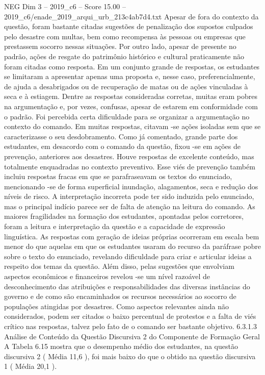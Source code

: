 \begin{textsample}{NEG Dim 3 – 2019\_c6 – Score 15.00 – 2019\_c6/enade\_2019\_arqui\_urb\_213c4ab7d4.txt}
Apesar de fora do contexto da questão, foram bastante citadas sugestões de penalização dos supostos culpados pelo desastre com multas, bem como recompensa às pessoas ou empresas que prestassem socorro nessas situações.
Por outro lado, apesar de presente no padrão, ações de resgate do patrimônio histórico e cultural praticamente não foram citadas como resposta.
Em um conjunto grande de respostas, os estudantes se limitaram a apresentar apenas uma proposta e, nesse caso, preferencialmente, de ajuda a desabrigados ou de recuperação de matas ou de ações vinculadas à seca e à estiagem.
Dentre as respostas consideradas corretas, muitas eram pobres na argumentação e, por vezes, confusas, apesar de estarem em conformidade com o padrão.
Foi percebida certa dificuldade para se organizar a argumentação no contexto do comando.
Em muitas respostas, citavam -se ações isoladas sem que se caracterizasse o seu desdobramento.
Como já comentado, grande parte dos estudantes, em desacordo com o comando da questão, fixou -se em ações de prevenção, anteriores aos desastres.
Houve respostas de excelente conteúdo, mas totalmente enquadradas no contexto preventivo.
Esse viés de prevenção também incluiu respostas fracas em que se parafraseavam os textos do enunciado, mencionando -se de forma superficial inundação, alagamentos, seca e redução dos níveis de risco.
A interpretação incorreta pode ter sido induzida pelo enunciado, mas o principal indício parece ser de falta de atenção na leitura do comando.
As maiores fragilidades na formação dos estudantes, apontadas pelos corretores, foram a leitura e interpretação da questão e a capacidade de expressão linguística.
As respostas com geração de ideias próprias ocorreram em escala bem menor do que aquelas em que os estudantes usaram do recurso da paráfrase pobre sobre o texto do enunciado, revelando dificuldade para criar e articular ideias a respeito dos temas da questão.
Além disso, pelas sugestões que envolviam aspectos econômicos e financeiros revelou -se um nível razoável de desconhecimento das atribuições e responsabilidades das diversas instâncias do governo e de como são encaminhados os recursos necessários ao socorro de populações atingidas por desastres.
Como aspectos relevantes ainda não considerados, podem ser citados o baixo percentual de protestos e a falta de viés crítico nas respostas, talvez pelo fato de o comando ser bastante objetivo. 6.3.1.3 Análise de Conteúdo da Questão Discursiva 2 do Componente de Formação Geral A Tabela 6.15 mostra que o desempenho médio dos estudantes, na questão discursiva 2 ( Média 11,6 ), foi mais baixo do que o obtido na questão discursiva 1 ( Média 20,1 ).

\end{textsample}
